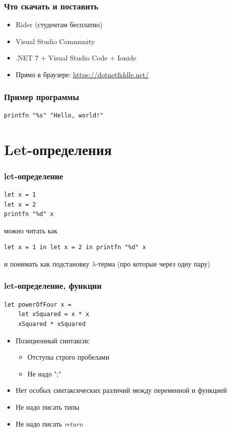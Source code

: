 \documentclass{../../slides-style}
\begin{document}
    \begin{frame}
        \frametitle{Что скачать и поставить}
        \begin{itemize}
            \item Rider (студентам бесплатно)
            \item Visual Studio Community
            \item .NET 7 + Visual Studio Code + Ionide
            \item Прямо в браузере: \url{https://dotnetfiddle.net/}
        \end{itemize}
    \end{frame}
    
    \begin{frame}[fragile]
        \frametitle{Пример программы}
        \begin{verbatim}
printfn "%s" "Hello, world!"
        \end{verbatim}
    \end{frame}

    \section{Let-определения}

    \begin{frame}[fragile]
        \frametitle{let-определение}
        \begin{verbatim}
let x = 1
let x = 2
printfn "%d" x
        \end{verbatim}
        можно читать как
        \begin{verbatim}
let x = 1 in let x = 2 in printfn "%d" x
        \end{verbatim}
        и понимать как подстановку $\lambda$-терма (про которые через одну пару)
    \end{frame}

    \begin{frame}[fragile]
        \frametitle{let-определение, функции}
        \begin{verbatim}
let powerOfFour x = 
    let xSquared = x * x
    xSquared * xSquared
        \end{verbatim}
        \begin{itemize}
            \item Позиционный синтаксис
            \begin{itemize}
                \item Отступы строго пробелами
                \item Не надо ";"
            \end{itemize}
            \item Нет особых синтаксических различий между переменной и функцией
            \item Не надо писать типы
            \item Не надо писать \textit{return}
        \end{itemize}
    \end{frame}
\end{document}
